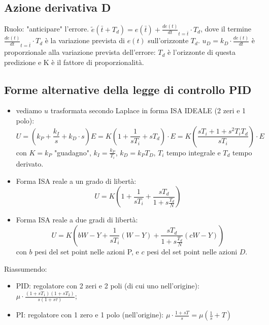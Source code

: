     \subsection{Azione derivativa D}
    Ruolo: "anticipare" l'errore.\newline
    \newline
    $\tilde{e}(\bar{t} + T_d) = e(\bar{t}) + \frac{d e(t)}{dt}_{t= \bar{t}} \cdot T_d$, dove il termine $\frac{d e(t)}{dt}_{t= \bar{t}} \cdot T_d$ è la variazione prevista di $e(t)$ sull'orizzonte $T_d$.\newline
    \newline
    $u_D =  k_D \cdot \frac{d e (t)}{dt}$ è proporzionale alla variazione prevista dell'errore: $T_d$ è l'orizzonte di questa predizione e K è il fattore di proporzionalità.
    \subsection{Forme alternative della legge di controllo PID}
    \begin{itemize}
        \item vediamo $u$ trasformata secondo Laplace in forma ISA IDEALE (2 zeri e 1 polo):
        \[
            U = (k_P + \frac{k_I}{s} + k_D \cdot s) E = K ( 1 + \frac{1}{sT_i} + s T_d) \cdot E = K \left( \frac{sT_i + 1 + s^2 T_i T_d}{sT_i} \right) \cdot E
        \]
        con $K = k_P$ "guadagno", $k_I = \frac{k_P}{T_i}$, $k_D = k_P T_D$, $T_i$ tempo integrale e $T_d$ tempo derivato.
        \item Forma ISA reale a un grado di libertà:
        \[
            U = K \left( 1+ \frac{1}{sT_i} + \frac{sT_d}{1+s \frac{T_d}{N}}\right)
        \]
        \item Forma ISA reale a due gradi di libertà:
        \[
            U = K \left( b W - Y + \frac{1}{sT_i}(W-Y) + \frac{sT_d}{1+s \frac{T_d}{N}} (c W-Y)\right)
        \]
        con $b$ pesi del set point nelle azioni P, e $c$ pesi del set point nelle azioni $D$. 
    \end{itemize}
    Riassumendo:
    \begin{itemize}
        \item PID: regolatore con 2 zeri e 2 poli (di cui uno nell'origine): $\mu \cdot \frac{(1+sT_1) (1+sT_2)}{s(1+s \tau)}$;
        \item PI: regolatore con 1 zero e 1 polo (nell'origine): $\mu \cdot  \frac{1+sT}{s} = \mu(\frac{1}{s}+ T)$ 
    \end{itemize} 
